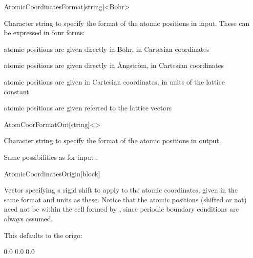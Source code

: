 \begin{fdfentry}{AtomicCoordinatesFormat}[string]<Bohr>

  Character string to specify the format of the atomic positions in
  input. These can be expressed in four forms:

  \begin{fdfoptions}

    atomic positions are given directly in Bohr, in Cartesian
    coordinates


    atomic positions are given directly in \AA ngstr\"om, in Cartesian
    coordinates

    \option[ScaledCartesian]%

    atomic positions are given in Cartesian coordinates, in units of
    the lattice constant


    atomic positions are given referred to the lattice vectors

  \end{fdfoptions}
  
\end{fdfentry}


\begin{fdfentry}{AtomCoorFormatOut}[string]<>

  Character string to specify the format of the atomic positions in
  output. 

  Same possibilities as for input .
  
\end{fdfentry}

\begin{fdfentry}{AtomicCoordinatesOrigin}[block]

  Vector specifying a rigid shift to apply to the atomic coordinates,
  given in the same format and units as these. Notice that the atomic
  positions (shifted or not) need not be within the cell formed by
  , since periodic boundary conditions are
  always assumed.

  This defaults to the origo:
  \begin{fdfexample}
    0.0   0.0   0.0
  \end{fdfexample}
  
\end{fdfentry}

